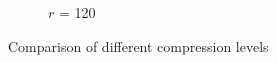 \begin{figure}[h]
\begin{subfigure}{0.3\textwidth}
      \caption{$r$ = 120}
      \label{fig:compressionNC}
  \end{subfigure}
  \caption{Comparison of different compression levels}
  \label{fig:compressionComparison}
\end{figure}
